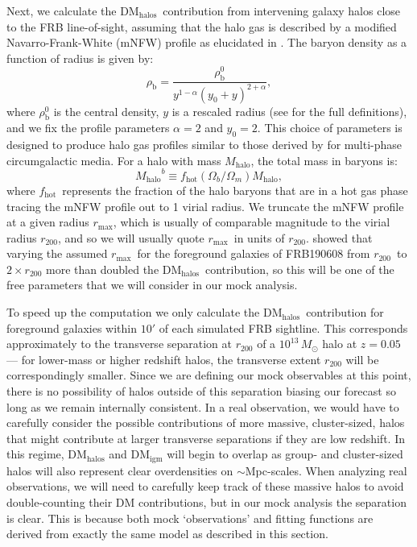 \documentclass[twocolumn]{aastex63}
\newcommand{\dmhalo}{\ensuremath{\mathrm{DM}_\mathrm{halos}}}
\newcommand{\dmigm}{\ensuremath{\mathrm{DM}_\mathrm{igm}}}
\newcommand{\fhot}{\ensuremath{f_\mathrm{hot}}}
\newcommand{\rmax}{\ensuremath{r_\mathrm{max}}}
\newcommand{\rvir}{\ensuremath{r_{200}}}
\newcommand{\mhalo}{\ensuremath{M_\mathrm{halo}}}
\begin{document}
\begin{CJK*}{UTF8}{gbsn}
Next, we calculate the \dmhalo\ contribution from intervening galaxy halos close to the FRB line-of-sight, 
assuming that the halo gas is described by a modified Navarro-Frank-White (mNFW) profile as elucidated in \citet{prochaska:2019}.
The baryon density as a function of radius is given by:
\begin{equation} \label{eq:rhob_halo}
\rho_\mathrm{b} = \frac{\rho^0_\mathrm{b}}{y^{1-\alpha}(y_0 + y)^{2+\alpha}},
\end{equation}
where $\rho^0_\mathrm{b}$ is the central density, $y$ is a rescaled radius (see \citealt{mathews:2017} for the full definitions), and we fix the profile parameters $\alpha=2$ and $y_0=2$. 
This choice of parameters is designed to produce halo gas profiles similar to those derived by \cite{maller:2004} for multi-phase circumgalactic media.
For a halo with mass \mhalo, the total mass in baryons is:
\begin{equation} \label{eq:mhalo_bar}
 \mhalo^b \equiv \fhot (\Omega_b/\Omega_m) \mhalo, 
 \end{equation}
 where
\fhot\ represents the fraction of the halo baryons that are in a hot gas phase tracing the mNFW profile out to 1 virial radius. 
We truncate the mNFW profile at a given radius \rmax, which is usually of comparable magnitude to the virial radius \rvir, and so we will usually quote \rmax\ in units of \rvir. 
\citet{simha:2020} showed that varying the assumed \rmax\ for the foreground galaxies of FRB190608 from \rvir\ to $2\times \rvir$ more than
doubled the \dmhalo\ contribution, so this will be one of the free parameters that we will consider in our mock analysis.

To speed up the computation we only calculate the \dmhalo\ contribution for foreground galaxies within $10'$ of each simulated FRB sightline. 
This corresponds approximately to the transverse separation at $r_{200}$ of a $10^{13}\,M_\odot$ halo at $z=0.05$ --- for lower-mass
or higher redshift halos, the transverse extent $r_{200}$ will be correspondingly smaller. 
Since we are defining our mock observables at this point, there is no possibility of halos outside of this separation biasing our forecast so long as we remain internally consistent. 
In a real observation, we would have to carefully consider the possible contributions of more massive, cluster-sized, halos that might contribute at larger transverse
separations if they are low redshift. In this regime, \dmhalo{} and \dmigm{} will begin to overlap as group- and cluster-sized halos will also represent clear overdensities on $\sim$Mpc-scales. When analyzing real observations, we will need to carefully keep track
of these massive halos to avoid double-counting their DM contributions, but in our mock analysis
the separation is clear. This is because both mock `observations' and fitting functions are derived from
exactly the same model as described in this section.


\end{CJK*}
\end{document}
